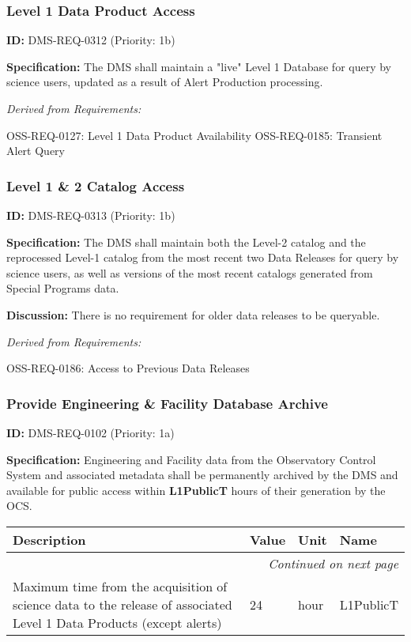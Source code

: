 \documentclass[SE,toc,lsstdraft]{lsstdoc}
\makeatletter
\newcommand{\paramname}[1]{\hspace{0pt}#1}
\newcommand{\unitname}[1]{\hspace{0pt}#1}
\newenvironment{parameters}[0]{%
\setlength\LTleft{0pt}
\setlength\LTright{\fill}
\begin{small}
\begin{longtable}[]{|p{0.49\textwidth}|l|p{0.6in}|p{1.70in}@{}|}

\hline \textbf{Description} & \textbf{Value} & \textbf{Unit} & \textbf{Name} \\ \hline
\endhead

\hline \multicolumn{4}{r}{\emph{Continued on next page}} \\
\endfoot

\hline\hline
\endlastfoot
}{%
\hline
\end{longtable}
\end{small}
}
\makeatother
\begin{document}
\subsubsection{Level 1 Data Product Access}

\label{DMS-REQ-0312}
\textbf{ID:} DMS-REQ-0312 (Priority: 1b)

\textbf{Specification:} The DMS shall maintain a "live" Level 1 Database for query by science users, updated as a result of Alert Production processing.

\emph{Derived from Requirements:}

OSS-REQ-0127:
Level 1 Data Product Availability \newline
OSS-REQ-0185:
Transient Alert Query \newline

\subsubsection{Level 1 \& 2 Catalog Access}

\label{DMS-REQ-0313}
\textbf{ID:} DMS-REQ-0313 (Priority: 1b)

\textbf{Specification:} The DMS shall maintain both the Level-2 catalog and the reprocessed Level-1 catalog from the most recent two Data Releases for query by science users, as well as versions of the most recent catalogs generated from Special Programs data.

\textbf{Discussion: }There is no requirement for older data releases to be queryable.

\emph{Derived from Requirements:}

OSS-REQ-0186:
Access to Previous Data Releases \newline

\subsubsection{Provide Engineering \& Facility Database Archive}

\label{DMS-REQ-0102}
\textbf{ID:} DMS-REQ-0102 (Priority: 1a)

\textbf{Specification:} Engineering and Facility data from the Observatory Control System and associated metadata shall be permanently archived by the DMS and available for public access within \textbf{L1PublicT} hours of their generation by the OCS.

\begin{parameters}
    Maximum time from the acquisition of science data to the release of associated Level 1 Data Products (except alerts)
&
24
&
\unitname{%
hour
}
&
\paramname{%
L1PublicT
} \\\hline
\end{parameters}
\end{document}
